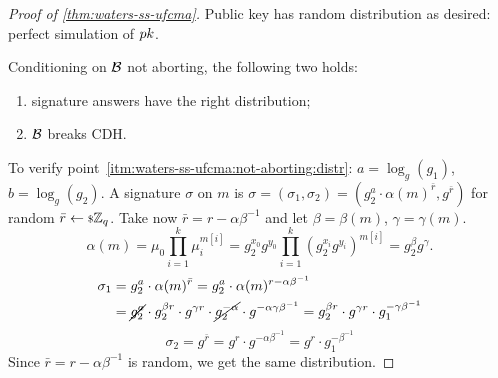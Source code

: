 \begin{proof}[Proof of \cref{thm:waters-ss-ufcma}]
	Public key has random distribution as desired: perfect simulation of $pk$.

	Conditioning on $\mathcal{B}$ not aborting, the following two holds:
	\begin{enumerate}
		\item \label{itm:waters-ss-ufcma:not-aborting:distr} signature answers have the right distribution;
		\item \label{itm:waters-ss-ufcma:not-aborting:cdh} $\mathcal{B}$ breaks \ac{CDH}.
	\end{enumerate}

	To verify point~\ref{itm:waters-ss-ufcma:not-aborting:distr}:
	$a = \log_{g}(g_1)$, $b = \log_{g}(g_2)$.
	A signature $\sigma$ on $m$ is $\sigma = (\sigma_1, \sigma_2) = (g_2^a \cdot \alpha(m)^{\bar{r}}, g^{\bar{r}})$ for random $\bar{r} \leftarrow {\scriptstyle \$} {\mathbb{Z}_q}$.
	Take now $\bar{r} = r - \alpha \beta^{-1}$ and let $\beta = \beta(m)$, $\gamma = \gamma(m)$.
	\begin{equation*}
		\alpha(m) = \mu_0 \prod_{i=1}^{k} \mu_i^{m[i]} = g_2^{x_0} g^{y_0} \prod_{i = 1}^{k} (g_2^{x_i} g^{y_i})^{m[i]} = g_2^{\beta} g^{\gamma}.
	\end{equation*}
	\begin{align*}
		\sigma_1 & = g_2^a \cdot \alpha(m)^{\bar{r}} =
		g_2^a \cdot \alpha(m)^{r - \alpha \beta^{-1}} \\
		& = \cancel{g_2^a} \cdot g_2^{\beta r} \cdot g^{\gamma r} \cdot \cancel{g_2^{-\alpha}} \cdot g^{-\alpha \gamma \beta^{-1}}
		= g_2^{\beta r} \cdot g^{\gamma r} \cdot g_1^{- \gamma \beta^{-1}}
	\end{align*}
	\begin{equation*}
		\sigma_2 = g^{\bar{r}} = g^{r} \cdot g^{-\alpha \beta^{-1}} = g^r \cdot g_1^{- \beta^{-1}}
	\end{equation*}
	Since $\bar{r} = r - \alpha \beta^{-1}$ is random, we get the same distribution.


\end{proof}
